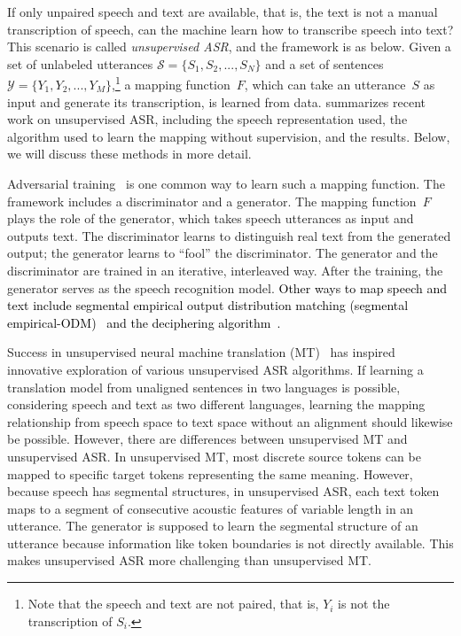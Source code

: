 If only unpaired speech and text are available, that is, the text is not a
manual transcription of speech, can the machine learn how to transcribe speech
into text?
This scenario is called \textit{unsupervised ASR}, and the framework is as
below. 
Given a set of unlabeled utterances $\mathcal{S}=\{S_1, S_2, ..., S_N\}$  and a
set of sentences $\mathcal{Y}=\{Y_1, Y_2, ..., Y_M\}$,\footnote{Note that
the speech and text are not paired, that is, $Y_i$ is not the transcription of
$S_i$.} a mapping function~$F$, which can take an utterance~$S$ as input and
generate its transcription, is learned from data. 
 summarizes recent work on unsupervised ASR,
including the speech representation used, the algorithm used to learn the
mapping without supervision, and the results. Below, we will discuss these
methods in more detail.


Adversarial training~\parencite{goodfellow_generative_2014,arjovsky_wasserstein_2017, gulrajani_improved_2017} is one common way to learn such a 
mapping function. 
The framework includes a discriminator and a generator.
The mapping function~$F$ plays the role of the generator, which takes speech utterances as input and outputs text.
The discriminator learns to distinguish real text from the generated
output; the generator learns to ``fool'' the discriminator.
The generator and the discriminator are trained in an iterative, 
interleaved way. 
After the training, the generator serves as the speech recognition model.
\textcolor{black}{
Other ways to map speech and text include segmental empirical output distribution matching (segmental empirical-ODM)~\parencite{yeh_unsupervised_2019} and the deciphering algorithm~\parencite{klejch_deciphering_2022}.}

Success in unsupervised neural machine translation
(MT)~\parencite{artetxe_unsupervised_2018, conneau_word_2018, lample_unsupervised_2018}
has inspired innovative exploration of various unsupervised ASR algorithms.
If learning a translation model from unaligned sentences in two languages is
possible, considering speech and text as two different languages, learning the
mapping relationship from speech space to text space without an alignment 
  should likewise be possible.   %
However, there are differences between unsupervised MT and unsupervised
ASR.
In unsupervised MT, most discrete source tokens can be mapped to specific
target tokens representing the same meaning. 
However, because speech has segmental structures, in unsupervised ASR, each text
token maps to a segment of consecutive acoustic features of variable length in
an utterance.
The generator is supposed to learn the segmental structure of an utterance
because information like token boundaries is not directly available.
This makes unsupervised ASR more challenging than unsupervised MT.

